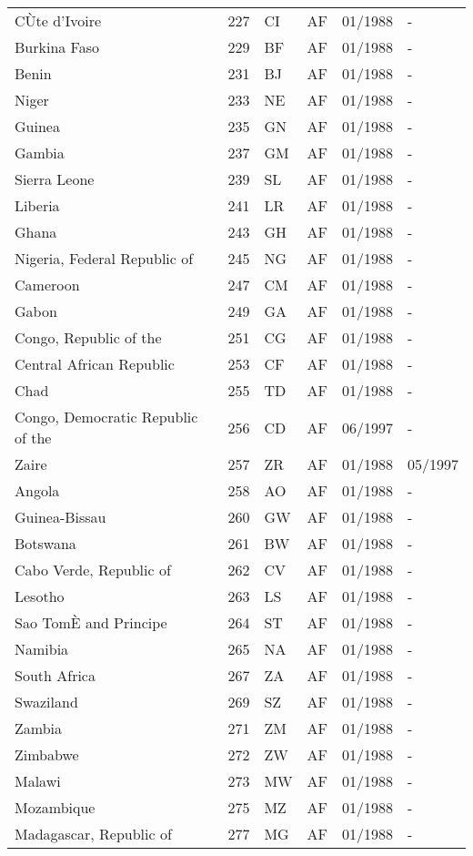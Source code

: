 \begin{small}
\begin{longtable}{p{4.3cm}p{1.5cm}p{1.5cm}p{1cm}p{2cm}p{2cm}}
CÙte d'Ivoire	&	227	&	CI	&	AF	&	01/1988	&	-	\\
Burkina Faso	&	229	&	BF	&	AF	&	01/1988	&	-	\\
Benin	&	231	&	BJ	&	AF	&	01/1988	&	-	\\
Niger	&	233	&	NE	&	AF	&	01/1988	&	-	\\
Guinea	&	235	&	GN	&	AF	&	01/1988	&	-	\\
Gambia	&	237	&	GM	&	AF	&	01/1988	&	-	\\
Sierra Leone	&	239	&	SL	&	AF	&	01/1988	&	-	\\
Liberia	&	241	&	LR	&	AF	&	01/1988	&	-	\\
Ghana	&	243	&	GH	&	AF	&	01/1988	&	-	\\
Nigeria, Federal Republic of	&	245	&	NG	&	AF	&	01/1988	&	-	\\
Cameroon	&	247	&	CM	&	AF	&	01/1988	&	-	\\
Gabon	&	249	&	GA	&	AF	&	01/1988	&	-	\\
Congo, Republic of the	&	251	&	CG	&	AF	&	01/1988	&	-	\\
Central African Republic	&	253	&	CF	&	AF	&	01/1988	&	-	\\
Chad	&	255	&	TD	&	AF	&	01/1988	&	-	\\
Congo, Democratic Republic of the	&	256	&	CD	&	AF	&	06/1997	&	-	\\
Zaire	&	257	&	ZR	&	AF	&	01/1988	&	05/1997	\\
Angola	&	258	&	AO	&	AF	&	01/1988	&	-	\\
Guinea-Bissau	&	260	&	GW	&	AF	&	01/1988	&	-	\\
Botswana	&	261	&	BW	&	AF	&	01/1988	&	-	\\
Cabo Verde, Republic of	&	262	&	CV	&	AF	&	01/1988	&	-	\\
Lesotho	&	263	&	LS	&	AF	&	01/1988	&	-	\\
Sao TomÈ and Principe	&	264	&	ST	&	AF	&	01/1988	&	-	\\
Namibia	&	265	&	NA	&	AF	&	01/1988	&	-	\\
South Africa	&	267	&	ZA	&	AF	&	01/1988	&	-	\\
Swaziland	&	269	&	SZ	&	AF	&	01/1988	&	-	\\
Zambia	&	271	&	ZM	&	AF	&	01/1988	&	-	\\
Zimbabwe	&	272	&	ZW	&	AF	&	01/1988	&	-	\\
Malawi	&	273	&	MW	&	AF	&	01/1988	&	-	\\
Mozambique	&	275	&	MZ	&	AF	&	01/1988	&	-	\\
Madagascar, Republic of	&	277	&	MG	&	AF	&	01/1988	&	-	\\

\end{longtable}
\end{small}
